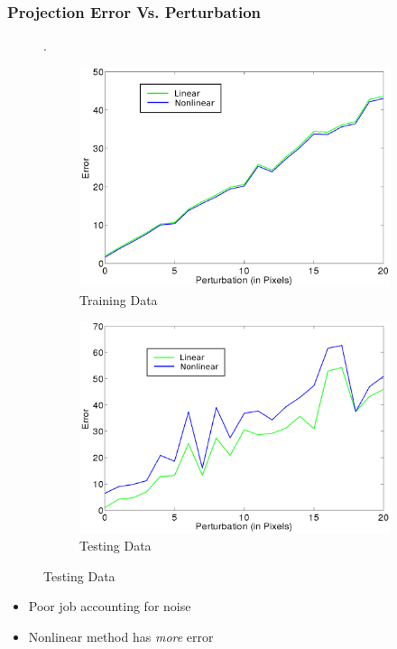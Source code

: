 \documentclass{beamer}
\begin{document}
\begin{frame}
\frametitle{Projection Error Vs. Perturbation}
\begin{figure}[H]
\setcounter{subfigure}{0}. 
	\begin{subfigure}[b]{.35\linewidth}
		\centering		
		\includegraphics[width=.9\textwidth]{p_err_plot_pert_train}
	 	\caption{Training Data}
	\end{subfigure}

	\begin{subfigure}[b]{.35\linewidth}
		\centering
		\includegraphics[width=.9\textwidth]{p_err_plot_pert_test}
	 	\caption{Testing Data}
	\end{subfigure}

\end{figure}


\begin{itemize}
\item Poor job accounting for noise
\item Nonlinear method has \textit{more} error
\end{itemize}

\end{frame}
\end{document}
